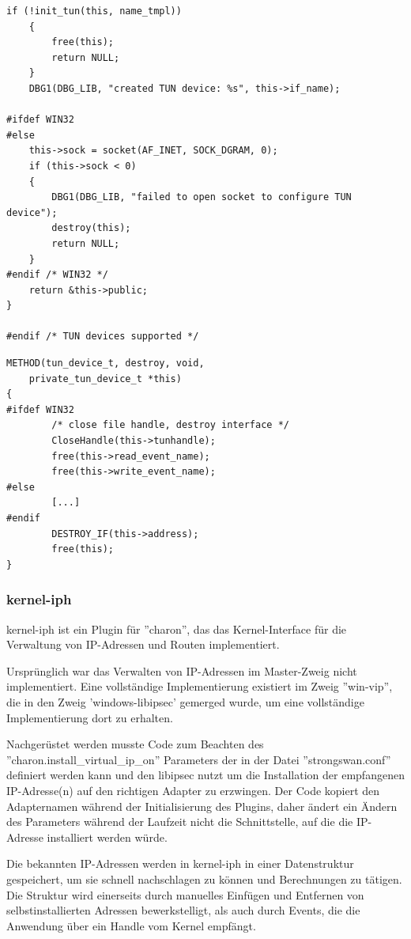 {\begin{lstlisting}[caption=Code für das Erstellen von tun\_device\_t]
	if (!init_tun(this, name_tmpl))
	{
		free(this);
		return NULL;
	}
	DBG1(DBG_LIB, "created TUN device: %s", this->if_name);

#ifdef WIN32
#else
	this->sock = socket(AF_INET, SOCK_DGRAM, 0);
	if (this->sock < 0)
	{
		DBG1(DBG_LIB, "failed to open socket to configure TUN device");
		destroy(this);
		return NULL;
	}
#endif /* WIN32 */
	return &this->public;
}

#endif /* TUN devices supported */
\end{lstlisting}

\begin{lstlisting}[caption=Relevanter code für tun\_device\_t->destroy()]
METHOD(tun_device_t, destroy, void,
	private_tun_device_t *this)
{
#ifdef WIN32
        /* close file handle, destroy interface */
        CloseHandle(this->tunhandle);
        free(this->read_event_name);
        free(this->write_event_name);
#else
        [...]
#endif
    	DESTROY_IF(this->address);
    	free(this);
}
\end{lstlisting}

\subsubsection{kernel-iph}
kernel-iph ist ein Plugin für ''charon'', das das Kernel-Interface
für die Verwaltung von IP-Adressen und Routen implementiert.

Ursprünglich war das Verwalten von IP-Adressen im Master-Zweig nicht implementiert.
Eine vollständige Implementierung existiert im Zweig ''win-vip'', die in den Zweig 'windows-libipsec'
gemerged wurde, um eine vollständige Implementierung dort zu erhalten.

Nachgerüstet werden musste Code zum Beachten des ''charon.install\_virtual\_ip\_on'' Parameters
der in der Datei ''strongswan.conf'' definiert werden kann und den libipsec nutzt um
die Installation der empfangenen IP-Adresse(n) auf den richtigen Adapter zu erzwingen.
Der Code kopiert den Adapternamen während der Initialisierung des Plugins, daher
ändert ein Ändern des Parameters während der Laufzeit nicht die Schnittstelle,
auf die die IP-Adresse installiert werden würde.

Die bekannten IP-Adressen werden in kernel-iph in einer Datenstruktur gespeichert,
um sie schnell nachschlagen zu können und Berechnungen zu tätigen. Die Struktur
wird einerseits durch manuelles Einfügen und Entfernen von selbstinstallierten Adressen
bewerkstelligt, als auch durch Events, die die Anwendung über ein Handle
vom Kernel empfängt.

}
